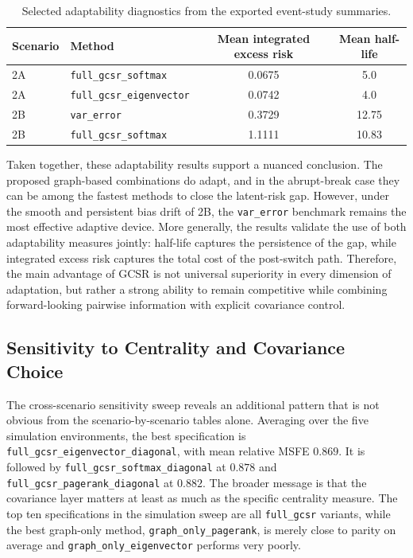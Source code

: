 \documentclass[11pt,a4paper]{article}
\begin{document}
\begin{table}[htbp]
\centering
\footnotesize
\begin{tabular}{llcc}
\toprule
Scenario & Method & Mean integrated excess risk & Mean half-life \\
\midrule
2A & \texttt{full\_gcsr\_softmax} & 0.0675 & 5.0 \\
2A & \texttt{full\_gcsr\_eigenvector} & 0.0742 & 4.0 \\
2B & \texttt{var\_error} & 0.3729 & 12.75 \\
2B & \texttt{full\_gcsr\_softmax} & 1.1111 & 10.83 \\
\bottomrule
\end{tabular}
\caption{Selected adaptability diagnostics from the exported event-study summaries.}
\label{tab:adaptability}
\end{table}

Taken together, these adaptability results support a nuanced conclusion. The proposed graph-based combinations do adapt, and in the abrupt-break case they can be among the fastest methods to close the latent-risk gap. However, under the smooth and persistent bias drift of 2B, the \texttt{var\_error} benchmark remains the most effective adaptive device. More generally, the results validate the use of both adaptability measures jointly: half-life captures the persistence of the gap, while integrated excess risk captures the total cost of the post-switch path. Therefore, the main advantage of GCSR is not universal superiority in every dimension of adaptation, but rather a strong ability to remain competitive while combining forward-looking pairwise information with explicit covariance control.

\subsection{Sensitivity to Centrality and Covariance Choice}

The cross-scenario sensitivity sweep reveals an additional pattern that is not obvious from the scenario-by-scenario tables alone. Averaging over the five simulation environments, the best specification is \texttt{full\_gcsr\_eigenvector\_diagonal}, with mean relative MSFE $0.869$. It is followed by \texttt{full\_gcsr\_softmax\_diagonal} at $0.878$ and \texttt{full\_gcsr\_pagerank\_diagonal} at $0.882$. The broader message is that the covariance layer matters at least as much as the specific centrality measure. The top ten specifications in the simulation sweep are all \texttt{full\_gcsr} variants, while the best graph-only method, \texttt{graph\_only\_pagerank}, is merely close to parity on average and \texttt{graph\_only\_eigenvector} performs very poorly.
\end{document}
